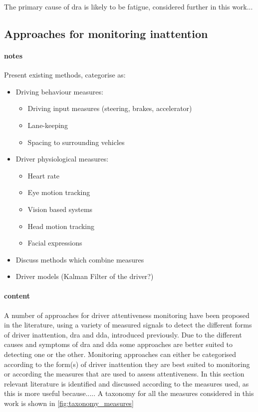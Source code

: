 \documentclass[11pt, parskip=half*,twoside=false]{scrbook}
\begin{document}
The primary cause of \gls{dra} is likely to be fatigue, considered further in this work... 


\subsection{Approaches for monitoring inattention} \label{ssec:approaches}

\paragraph{notes}
Present existing methods, categorise as:
\begin{itemize}
	\item Driving behaviour measures:
	\begin{itemize}
		\item Driving input measures (steering, brakes, accelerator)
		\item Lane-keeping
		\item Spacing to surrounding vehicles
	\end{itemize}
	\item Driver physiological measures:
	\begin{itemize}
		\item Heart rate
		\item Eye motion tracking
		\item Vision based systems
		\item Head motion tracking
		\item Facial expressions
	\end{itemize}
	\item Discuss methods which combine measures
	\item Driver models (Kalman Filter of the driver?)
\end{itemize}

\paragraph{content}
A number of approaches for driver attentiveness monitoring have been proposed in the literature, using a variety of measured signals to detect the different forms of driver inattention, \gls{dra} and \gls{dda}, introduced previously. Due to the different causes and symptoms of \gls{dra} and \gls{dda} some approaches are better suited to detecting one or the other. Monitoring approaches can either be categorised according to the form(s) of driver inattention they are best suited to monitoring or according the measures that are used to assess attentiveness. In this section relevant literature is identified and discussed according to the measures used, as this is more useful because..... A taxonomy for all the measures considered in this work is shown in \cref{fig:taxonomy_measures}
\end{document}
